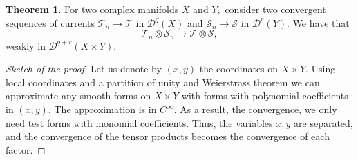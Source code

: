 \documentclass[11pt]{amsart}
\theoremstyle{definition}
\newtheorem{theorem}{Theorem}[section]
\newtheorem{definition}[theorem]{Definition}
\newtheorem{lemma}[theorem]{Lemma}
\newcommand{\lto}{\longrightarrow}
\newcommand{\C}{\mathbb{C}}
\newcommand{\sD}{\mathscr{D}}
\newcommand{\cC}{\mathcal{C}}
\newcommand{\sT}{\mathscr{T}}
\newcommand{\sS}{\mathscr{S}}
\begin{document}






\begin{theorem}\label{thm:tensor-conv}
  For two complex manifolds $X$ and $Y,$  consider two convergent sequences of currents $\sT_n \lto \sT$ in $\sD^q(X)$ and $\sS_n \lto \sS$ in $\sD^r(Y)$. We have that 
    $$
     \sT_{n} \otimes \sS_n \lto \sT \otimes \sS,
    $$
    weakly in $\sD^{q+r}(X \times Y).$
\end{theorem}
\begin{proof}[Sketch of the proof]
Let us denote by $(x,y)$ the coordinates on $X \times Y$. Using local coordinates and a partition of unity and Weierstrass theorem we can approximate any smooth forms on $X \times Y$ with forms with polynomial coefficients in $(x,y).$ The approximation is in $C^\infty$. As a result, the convergence, we only need test forms with monomial coefficients. Thus, the variables $x, y$ are separated, and the convergence of the tensor products becomes the convergence of each factor.\end{proof}
\end{document}
